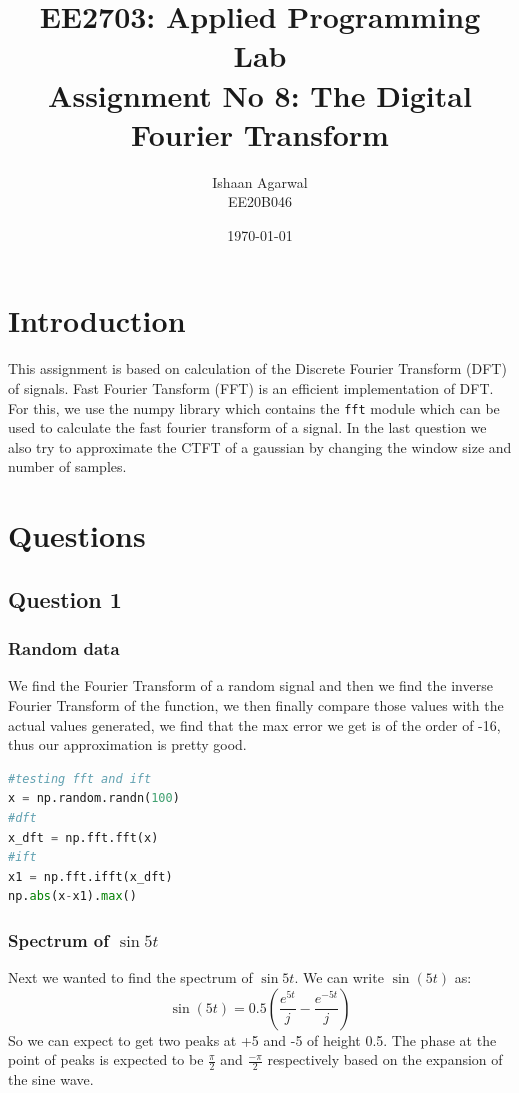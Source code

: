 \documentclass[11pt, a4paper]{article}
\title{EE2703: Applied Programming Lab \\ Assignment No 8: The Digital Fourier Transform} %
\author{Ishaan Agarwal \\ EE20B046} %
\date{\today} %
\begin{document}
		
		
\maketitle %

\section{Introduction}
This assignment is based on calculation of the Discrete Fourier Transform (DFT) of signals. Fast Fourier Tansform (FFT) is an efficient implementation of DFT. For this, we use the numpy library which contains the \texttt{fft} module which can be used to calculate the fast fourier transform of a signal. In the last question we also try to approximate the CTFT of a gaussian by changing the window size and number of samples. 

\section{Questions}
\subsection{Question 1}
\subsubsection{Random data}
We find the Fourier Transform of a random signal and then we find the inverse Fourier Transform of the function, we then finally compare those values with the actual values generated,  we find that the max error we get is of the order of -16, thus our approximation is pretty good.

\begin{lstlisting}[language = Python]
#testing fft and ift
x = np.random.randn(100)
#dft
x_dft = np.fft.fft(x) 
#ift
x1 = np.fft.ifft(x_dft)
np.abs(x-x1).max()
\end{lstlisting}

\subsubsection{Spectrum of $\sin{5t}$}
Next we wanted to find the spectrum of $\sin{5t}$. We can write $\sin(5t)$ as:
$$\sin(5t) = 0.5(\frac{e^{5t}}{j}-\frac{e^{-5t}}{j})$$
So we can expect to get two peaks at +5 and -5 of height 0.5. The phase at the point of peaks is expected to be $\frac{\pi}{2}$ and $\frac{-\pi}{2}$ respectively based on the expansion of the sine wave.
\end{document}
